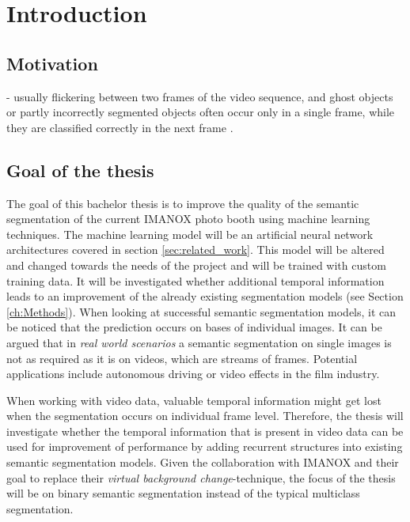 \documentclass[11pt,
  paper=a4, 
  bibliography=totocnumbered,
	captions=tableheading,
	BCOR=10mm
]{scrreprt}
\theoremstyle{definition}
\begin{document}


\chapter{Introduction}
\section{Motivation}
- usually flickering between two frames of the video sequence, 
and ghost objects or partly incorrectly segmented objects often occur only in a single frame, 
while they are classified correctly in the next frame \cite{Pfeuffer2_2019}.

\section{Goal of the thesis}

The goal of this bachelor thesis is to improve the quality of the semantic segmentation of the current IMANOX photo booth using machine learning techniques.
The machine learning model will be an artificial neural network architectures covered in section \ref{sec:related_work}.
This model will be altered and changed towards the needs of the project and will be trained with custom training data.
It will be investigated whether additional temporal information leads to an improvement of the already existing segmentation models (see Section \ref{ch:Methods}).
When looking at successful semantic segmentation models, it can be noticed that the prediction occurs on bases of individual images.
It can be argued that in \textit{real world scenarios} a semantic segmentation on single images is not as required as it is on videos, which are streams of frames.
Potential applications include autonomous driving or video effects in the film industry.


When working with video data, valuable temporal information might get lost when the segmentation occurs on individual frame level.
Therefore, the thesis will investigate whether the temporal information that is present in video data can be used for improvement of performance by adding recurrent structures
into existing semantic segmentation models. 
Given the collaboration with IMANOX and their goal to replace their \textit{virtual background change}-technique, the focus of the thesis will be on binary semantic segmentation
instead of the typical multiclass segmentation. 
\end{document}
